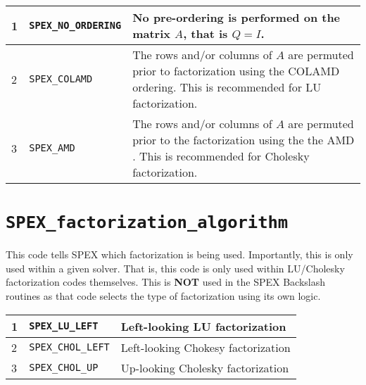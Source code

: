 \documentclass[12pt,oneside]{book}
\theoremstyle{definition}
\newenvironment{SizedCenteredTabular}[2][\small]
    {   
        #1\begin{center}\begin{tabular}{#2}
    }{ 
        \end{tabular}\end{center}
    }
\begin{document}
\begin{SizedCenteredTabular}{llp{4in}} \hline
    1 & \verb|SPEX_NO_ORDERING| & No pre-ordering is performed on the matrix $A$,
                                  that is $Q = I$. \\ \hline
    2 & \verb|SPEX_COLAMD|      & The rows and/or columns of $A$ are permuted prior to
                                  factorization using the COLAMD
                                  \cite{davis2004algorithmcolamd} ordering.
                                  This is recommended for LU factorization. \\ \hline
    3 & \verb|SPEX_AMD|         & The rows and/or columns of $A$ are permuted prior 
                                  to the factorization using the the AMD
                                 \cite{amestoy2004algorithmamd}.
                                 This is recommended for Cholesky factorization. \\ \hline
\end{SizedCenteredTabular}


\section{\texttt{SPEX\_factorization\_algorithm}} \label{ss:SPEX_factorization_algorithm}
This code tells SPEX which factorization is being used. Importantly, this is only used within a given solver. That is, this code is only used within LU/Cholesky factorization codes themselves. This is \textbf{NOT} used in the SPEX Backslash routines as that code selects the type of factorization using its own logic.

\begin{SizedCenteredTabular}{llp{4in}} \hline
    1 & \verb|SPEX_LU_LEFT|      & Left-looking LU factorization \\ \hline
    2 & \verb|SPEX_CHOL_LEFT|    & Left-looking Chokesy factorization\\ \hline
    3 & \verb|SPEX_CHOL_UP|      & Up-looking Cholesky factorization \\ \hline
\end{SizedCenteredTabular}
\end{document}
